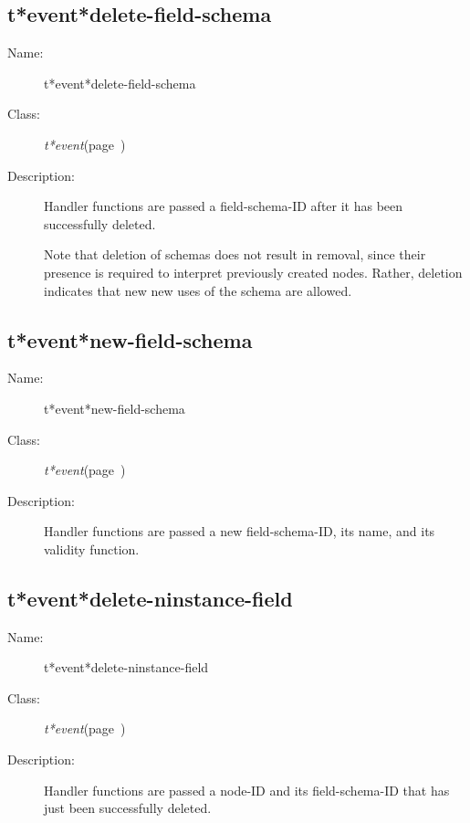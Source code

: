 \subsection{t*event*delete-field-schema}
\label{t*event*delete-field-schema}

\begin{description}
\item [Name:]  t*event*delete-field-schema

\item [Class:] {\sl t*event}\hfill(page~\pageref{t*event})

\item [Description:]

Handler functions are passed a field-schema-ID after
it has been successfully deleted.

Note that deletion of schemas does not result in 
removal, since their presence is required to interpret
previously created nodes. Rather, deletion indicates
that new new uses of the schema are allowed.


\end{description}
\horizontalline

\subsection{t*event*new-field-schema}
\label{t*event*new-field-schema}

\begin{description}
\item [Name:]  t*event*new-field-schema

\item [Class:] {\sl t*event}\hfill(page~\pageref{t*event})

\item [Description:]

Handler functions are passed a new field-schema-ID,
its name, and its validity function.


\end{description}
\horizontalline

\subsection{t*event*delete-ninstance-field}
\label{t*event*delete-ninstance-field}

\begin{description}
\item [Name:]  t*event*delete-ninstance-field

\item [Class:] {\sl t*event}\hfill(page~\pageref{t*event})

\item [Description:]

Handler functions are passed a node-ID and its
field-schema-ID that has just been successfully
deleted.


\end{description}
\horizontalline

